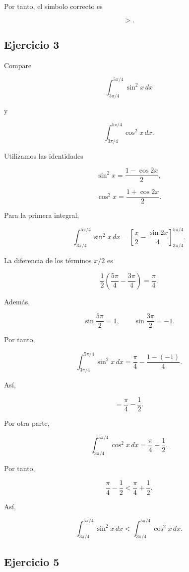 \documentclass[12pt]{article}
\begin{document}
Por tanto, el símbolo correcto es

\[
\boxed{>}.
\]

\subsection*{Ejercicio 3}

Compare

\[
\int_{3\pi/4}^{5\pi/4}\sin^2x\,dx
\]

y

\[
\int_{3\pi/4}^{5\pi/4}\cos^2x\,dx.
\]

Utilizamos las identidades

\[
\sin^2x=\frac{1-\cos2x}{2},
\]

\[
\cos^2x=\frac{1+\cos2x}{2}.
\]

Para la primera integral,

\[
\int_{3\pi/4}^{5\pi/4}\sin^2x\,dx
=
\left[
\frac{x}{2}-\frac{\sin2x}{4}
\right]_{3\pi/4}^{5\pi/4}.
\]

La diferencia de los términos \(x/2\) es

\[
\frac12
\left(
\frac{5\pi}{4}-\frac{3\pi}{4}
\right)
=
\frac{\pi}{4}.
\]

Además,

\[
\sin\frac{5\pi}{2}=1,
\qquad
\sin\frac{3\pi}{2}=-1.
\]

Por tanto,

\[
\int_{3\pi/4}^{5\pi/4}\sin^2x\,dx
=
\frac{\pi}{4}
-
\frac{1-(-1)}{4}.
\]

Así,

\[
=
\frac{\pi}{4}-\frac12.
\]

Por otra parte,

\[
\int_{3\pi/4}^{5\pi/4}\cos^2x\,dx
=
\frac{\pi}{4}+\frac12.
\]

Por tanto,

\[
\frac{\pi}{4}-\frac12
<
\frac{\pi}{4}+\frac12.
\]

Así,

\[
\boxed{
\int_{3\pi/4}^{5\pi/4}\sin^2x\,dx
<
\int_{3\pi/4}^{5\pi/4}\cos^2x\,dx
}.
\]

\subsection*{Ejercicio 5}
\end{document}
